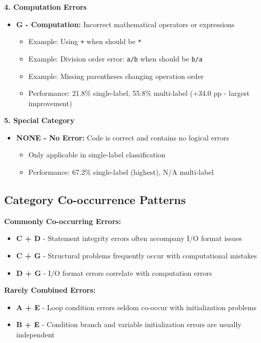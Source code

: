 \documentclass[12pt,a4paper]{article}
\begin{document}
\textbf{4. Computation Errors}
\begin{itemize}[leftmargin=*]
    \item \textbf{G - Computation:} Incorrect mathematical operators or expressions
    \begin{itemize}
        \item Example: Using \texttt{+} when should be \texttt{*}
        \item Example: Division order error: \texttt{a/b} when should be \texttt{b/a}
        \item Example: Missing parentheses changing operation order
        \item Performance: 21.8\% single-label, 55.8\% multi-label (+34.0 pp - largest improvement)
    \end{itemize}
\end{itemize}

\textbf{5. Special Category}
\begin{itemize}[leftmargin=*]
    \item \textbf{NONE - No Error:} Code is correct and contains no logical errors
    \begin{itemize}
        \item Only applicable in single-label classification
        \item Performance: 67.2\% single-label (highest), N/A multi-label
    \end{itemize}
\end{itemize}

\subsection{Category Co-occurrence Patterns}

\textbf{Commonly Co-occurring Errors:}
\begin{itemize}[leftmargin=*]
    \item \textbf{C + D} - Statement integrity errors often accompany I/O format issues
    \item \textbf{C + G} - Structural problems frequently occur with computational mistakes
    \item \textbf{D + G} - I/O format errors correlate with computation errors
\end{itemize}

\textbf{Rarely Combined Errors:}
\begin{itemize}[leftmargin=*]
    \item \textbf{A + E} - Loop condition errors seldom co-occur with initialization problems
    \item \textbf{B + E} - Condition branch and variable initialization errors are usually independent
\end{itemize}
\end{document}
